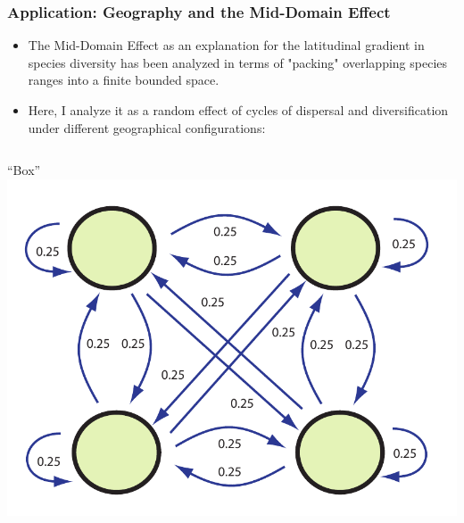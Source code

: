 \documentclass[11pt,t]{beamer}
\begin{document}
\begin{frame}
	\frametitle{Application: Geography and the Mid-Domain Effect}
	
	\begin{itemize}
		\item The Mid-Domain Effect as an explanation for the latitudinal gradient in species diversity has been analyzed in terms of "packing" overlapping species ranges into a finite bounded space.
		\item Here, I analyze it as a random effect of cycles of dispersal and diversification under different geographical configurations:	
	\end{itemize}
	
		\begin{columns}		
			\begin{column}[c]{0.4 \textwidth}
				\begin{center}
				``Box'' \\
				\includegraphics[scale=0.25]{box-model.pdf}
				\end{center}
			\end{column}
			

\end{columns}
\end{frame}
\end{document}
